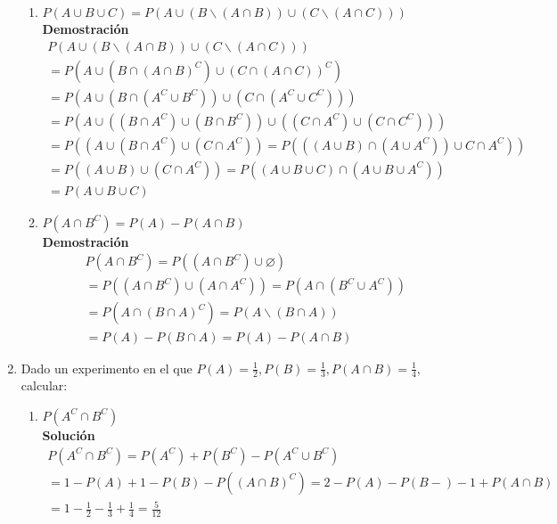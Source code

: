 \begin{enumerate}
\begin{enumerate}
        \item $P(A \cup B \cup C) = P(A \cup (B \backslash (A \cap B)) \cup (C \backslash (A \cap C)))$
    	\\\textbf{Demostración}
        \begin{gather*}
            P(A \cup (B \backslash (A \cap B)) \cup (C \backslash (A \cap C))) \\
            = P(A \cup (B \cap (A \cap B)^C) \cup (C \cap (A \cap C))^C) \\
            = P(A \cup (B \cap (A^C \cup B^C)) \cup (C \cap (A^C \cup C^C))) \\
            = P(A \cup ((B \cap A^C) \cup (B \cap B^C)) \cup ((C \cap A^C) \cup (C \cap C^C))) \\
            = P((A \cup (B \cap A^C) \cup (C\cap A^C)) = P(((A \cup B) \cap (A \cup A^C)) \cup C \cap A^C)) \\
            = P((A \cup B) \cup (C \cap A^C)) = P((A \cup B \cup C) \cap (A \cup B \cup A^C)) \\
            = P(A \cup B \cup C)
    	\end{gather*}

        \item $P(A \cap B^C) = P(A) - P(A \cap B)$
    	\\\textbf{Demostración}
        \begin{gather*}
            P(A \cap B^C) = P((A \cap B^C) \cup \diameter) \\
            = P((A \cap B^C) \cup (A \cap A^C)) = P(A \cap (B^C \cup A^C)) \\
            = P(A \cap (B \cap A)^C) = P(A \backslash (B \cap A)) \\
            = P(A) - P(B \cap A) = P(A) - P(A \cap B)
    	\end{gather*}
    \end{enumerate}
	
	\item Dado un experimento en el que $P(A) = \frac{1}{2}, P(B) = \frac{1}{3}, P(A \cap B) = \frac{1}{4}$, calcular:
    \begin{enumerate}
        \item $P(A^C \cap B^C)$
    	\\\textbf{Solución}
        \begin{gather*}
            P(A^C \cap B^C) = P(A^C) + P(B^C) - P(A^C \cup B^C) \\
            = 1 - P(A) + 1 - P(B) - P((A \cap B)^C) = 2 - P(A) - P(B-) - 1 + P(A \cap B) \\
            = 1 - \frac{1}{2} - \frac{1}{3} + \frac{1}{4} = \frac{5}{12}
    	\end{gather*}


\end{enumerate}
\end{enumerate}
